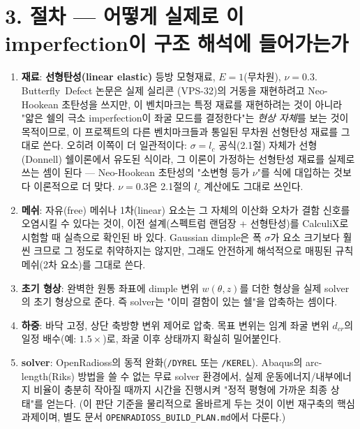 \documentclass[11pt]{article}
\begin{document}
\section{3. 절차 --- 어떻게 실제로 이 imperfection이 구조 해석에 들어가는가}

\begin{enumerate}
\item \textbf{재료}: \textbf{선형탄성(linear elastic)} 등방 모형재료,
      $E{=}1$(무차원), $\nu{=}0.3$. Butterfly~Defect 논문은 실제 실리콘
      (VPS-32)의 거동을 재현하려고 Neo-Hookean 초탄성을 쓰지만, 이 벤치마크는
      특정 재료를 재현하려는 것이 아니라 "얇은 쉘의 극소 imperfection이
      좌굴 모드를 결정한다"는 \emph{현상 자체}를 보는 것이 목적이므로, 이
      프로젝트의 다른 벤치마크들과 통일된 무차원 선형탄성 재료를 그대로
      쓴다. 오히려 이쪽이 더 일관적이다: $\sigma=l_c$ 공식(2.1절) 자체가
      선형(Donnell) 쉘이론에서 유도된 식이라, 그 이론이 가정하는 선형탄성
      재료를 실제로 쓰는 셈이 된다 --- Neo-Hookean 초탄성의 "소변형 등가
      $\nu$"를 식에 대입하는 것보다 이론적으로 더 맞다. $\nu{=}0.3$은
      2.1절의 $l_c$ 계산에도 그대로 쓰인다.
\item \textbf{메쉬}: 자유(free) 메쉬나 1차(linear) 요소는 그 자체의 이산화
      오차가 결함 신호를 오염시킬 수 있다는 것이, 이전 설계(스펙트럼 랜덤장 +
      선형탄성)를 CalculiX로 시험할 때 실측으로 확인된 바 있다. Gaussian dimple은
      폭 $\sigma$가 요소 크기보다 훨씬 크므로 그 정도로 취약하지는 않지만,
      그래도 안전하게 해석적으로 매핑된 규칙 메쉬(2차 요소)를 그대로 쓴다.
\item \textbf{초기 형상}: 완벽한 원통 좌표에 dimple 변위 $w(\theta,z)$를 더한
      형상을 실제 solver의 초기 형상으로 준다. 즉 solver는 "이미 결함이 있는
      쉘"을 압축하는 셈이다.
\item \textbf{하중}: 바닥 고정, 상단 축방향 변위 제어로 압축. 목표 변위는 임계
      좌굴 변위 $d_{cr}$의 일정 배수(예: $1.5\times$)로, 좌굴 이후 상태까지 확실히
      밀어붙인다.
\item \textbf{solver}: OpenRadioss의 동적 완화(\texttt{/DYREL} 또는 \texttt{/KEREL}).
      Abaqus의 arc-length(Riks) 방법을 쓸 수 없는 무료 solver 환경에서, 실제
      운동에너지/내부에너지 비율이 충분히 작아질 때까지 시간을 진행시켜
      "정적 평형에 가까운 최종 상태"를 얻는다. (이 판단 기준을 물리적으로
      올바르게 두는 것이 이번 재구축의 핵심 과제이며, 별도 문서
      \texttt{OPENRADIOSS\_BUILD\_PLAN.md}에서 다룬다.)
\end{enumerate}
\end{document}
